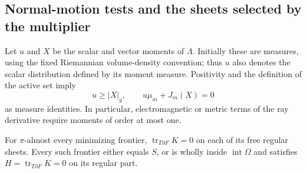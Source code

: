 \subsection{Normal-motion tests and the sheets selected by the multiplier}

Let $u$ and $X$ be the scalar and vector moments of $\Lambda$.
Initially these are measures, using the fixed Riemannian
volume-density convention; thus $u$ also denotes the scalar
distribution defined by its moment measure.  Positivity and the
definition of the active set imply
\begin{equation}
 u\ge |X|_g,\qquad u\mu_m+J_m(X)=0
 \label{var:moment-complementarity}
\end{equation}
as measure identities.  In particular, electromagnetic or
metric terms of the ray derivative require moments of order at
most one.

\begin{lemma}
\label{var:trace-free-sheets}
For $\pi$-almost every minimizing frontier,
$\operatorname{tr}_{T\partial F}K=0$ on each of its free regular
sheets.  Every such frontier either equals $S$, or is wholly
inside $\operatorname{int}\Omega$ and satisfies
$H=\operatorname{tr}_{T\partial F}K=0$ on its regular part.
\end{lemma}

